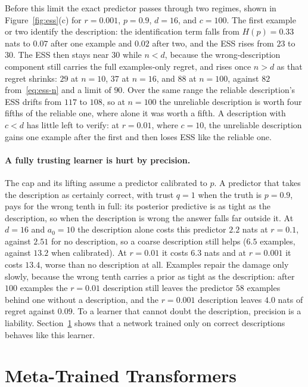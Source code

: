 \documentclass[10pt]{article}
\begin{document}
Before this limit the exact predictor passes through two regimes, shown in Figure~\ref{fig:ess}(c) for $r = 0.001$, $p = 0.9$, $d = 16$, and $c = 100$. The first example or two identify the description: the identification term falls from $H(p) = 0.33$ nats to $0.07$ after one example and $0.02$ after two, and the ESS rises from $23$ to $30$. The ESS then stays near $30$ while $n < d$, because the wrong-description component still carries the full examples-only regret, and rises once $n > d$ as that regret shrinks: $29$ at $n = 10$, $37$ at $n = 16$, and $88$ at $n = 100$, against $82$ from~\eqref{eq:ess-n} and a limit of $90$. Over the same range the reliable description's ESS drifts from $117$ to $108$, so at $n = 100$ the unreliable description is worth four fifths of the reliable one, where alone it was worth a fifth. A description with $c < d$ has little left to verify: at $r = 0.01$, where $c = 10$, the unreliable description gains one example after the first and then loses ESS like the reliable one.

\paragraph{A fully trusting learner is hurt by precision.}
The cap and its lifting assume a predictor calibrated to $p$. A predictor that takes the description as certainly correct, with trust $q = 1$ when the truth is $p = 0.9$, pays for the wrong tenth in full: its posterior predictive is as tight as the description, so when the description is wrong the answer falls far outside it. At $d = 16$ and $a_0 = 10$ the description alone costs this predictor $2.2$ nats at $r = 0.1$, against $2.51$ for no description, so a coarse description still helps ($6.5$ examples, against $13.2$ when calibrated). At $r = 0.01$ it costs $6.3$ nats and at $r = 0.001$ it costs $13.4$, worse than no description at all. Examples repair the damage only slowly, because the wrong tenth carries a prior as tight as the description: after $100$ examples the $r = 0.01$ description still leaves the predictor $58$ examples behind one without a description, and the $r = 0.001$ description leaves $4.0$ nats of regret against $0.09$. To a learner that cannot doubt the description, precision is a liability. Section~\ref{sec:networks} shows that a network trained only on correct descriptions behaves like this learner.

\section{Meta-Trained Transformers}\label{sec:networks}
\end{document}
